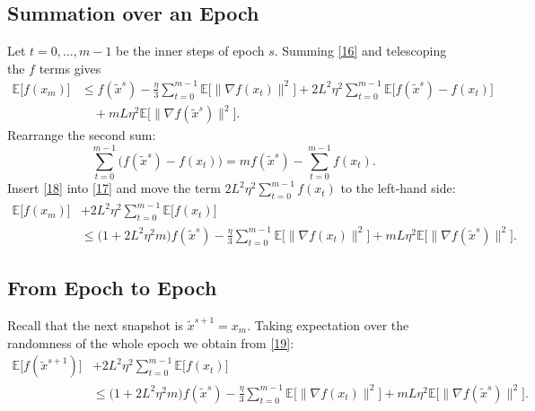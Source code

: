 \documentclass{article}
\newcommand{\E}{\mathbb{E}}
\begin{document}
\subsection*{Summation over an Epoch}
Let $t=0,\dots,m-1$ be the inner steps of epoch $s$.  Summing \eqref{16} and telescoping the $f$ terms gives
\[
\begin{aligned}
\E\!\big[f(x_{m})\big] 
&\le f(\tilde{x}^{s}) -\frac{\eta}{3}\sum_{t=0}^{m-1}\E\!\big[\|\nabla f(x_t)\|^{2}\big]
   +2L^{2}\eta^{2}\sum_{t=0}^{m-1}\E\!\big[f(\tilde{x}^{s})-f(x_t)\big] \\
&\quad +mL\eta^{2}\E\!\big[\|\nabla f(\tilde{x}^{s})\|^{2}\big].
\end{aligned}
\tag{17}
\]
Rearrange the second sum:
\[
\sum_{t=0}^{m-1}\big(f(\tilde{x}^{s})-f(x_t)\big)
= m f(\tilde{x}^{s})-\sum_{t=0}^{m-1}f(x_t).
\tag{18}
\]
Insert \eqref{18} into \eqref{17} and move the term $2L^{2}\eta^{2}\sum_{t=0}^{m-1}f(x_t)$ to the left‑hand side:
\[
\begin{aligned}
\E\!\big[f(x_{m})\big]
&+2L^{2}\eta^{2}\sum_{t=0}^{m-1}\E\!\big[f(x_t)\big] \\
&\le \big(1+2L^{2}\eta^{2}m\big)f(\tilde{x}^{s})
   -\frac{\eta}{3}\sum_{t=0}^{m-1}\E\!\big[\|\nabla f(x_t)\|^{2}\big]
   +mL\eta^{2}\E\!\big[\|\nabla f(\tilde{x}^{s})\|^{2}\big].
\end{aligned}
\tag{19}
\]

\subsection*{From Epoch to Epoch}
Recall that the next snapshot is $\tilde{x}^{s+1}=x_{m}$.  Taking expectation over the randomness of the whole epoch we obtain from \eqref{19}:
\[
\begin{aligned}
\E\!\big[f(\tilde{x}^{s+1})\big]
&+2L^{2}\eta^{2}\sum_{t=0}^{m-1}\E\!\big[f(x_t)\big] \\
&\le \big(1+2L^{2}\eta^{2}m\big)f(\tilde{x}^{s})
   -\frac{\eta}{3}\sum_{t=0}^{m-1}\E\!\big[\|\nabla f(x_t)\|^{2}\big]
   +mL\eta^{2}\E\!\big[\|\nabla f(\tilde{x}^{s})\|^{2}\big].
\end{aligned}
\tag{20}
\]
\end{document}
